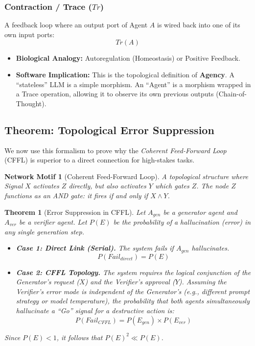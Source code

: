 \documentclass[11pt, a4paper]{article}
\newtheorem{theorem}{Theorem}
\newtheorem{motif}{Network Motif}
\begin{document}
\subsubsection{Contraction / Trace ($Tr$)}
A feedback loop where an output port of Agent $A$ is wired back into one of its own input ports:
\begin{equation}
    Tr(A)
\end{equation}
\begin{itemize}
    \item \textbf{Biological Analogy:} Autoregulation (Homeostasis) or Positive Feedback.
    \item \textbf{Software Implication:} This is the topological definition of \textbf{Agency}. A ``stateless'' LLM is a simple morphism. An ``Agent'' is a morphism wrapped in a Trace operation, allowing it to observe its own previous outputs (Chain-of-Thought).
\end{itemize}

\subsection{Theorem: Topological Error Suppression}

We now use this formalism to prove why the \textit{Coherent Feed-Forward Loop} (CFFL) is superior to a direct connection for high-stakes tasks.

\begin{motif}[Coherent Feed-Forward Loop]
A topological structure where Signal $X$ activates $Z$ directly, but also activates $Y$ which gates $Z$. The node $Z$ functions as an AND gate: it fires if and only if $X \land Y$.
\end{motif}

\begin{theorem}[Error Suppression in CFFL]
Let $A_{gen}$ be a generator agent and $A_{ver}$ be a verifier agent. Let $P(E)$ be the probability of a hallucination (error) in any single generation step.

\begin{itemize}
    \item \textbf{Case 1: Direct Link (Serial).} The system fails if $A_{gen}$ hallucinates.
    \[ P(Fail_{direct}) = P(E) \]
    
    \item \textbf{Case 2: CFFL Topology.} The system requires the logical conjunction of the Generator's request ($X$) and the Verifier's approval ($Y$). Assuming the Verifier's error mode is independent of the Generator's (e.g., different prompt strategy or model temperature), the probability that \textit{both} agents simultaneously hallucinate a ``Go'' signal for a destructive action is:
    \[ P(Fail_{CFFL}) = P(E_{gen}) \times P(E_{ver}) \]
\end{itemize}

Since $P(E) < 1$, it follows that $P(E)^2 \ll P(E)$.
\end{theorem}
\end{document}
